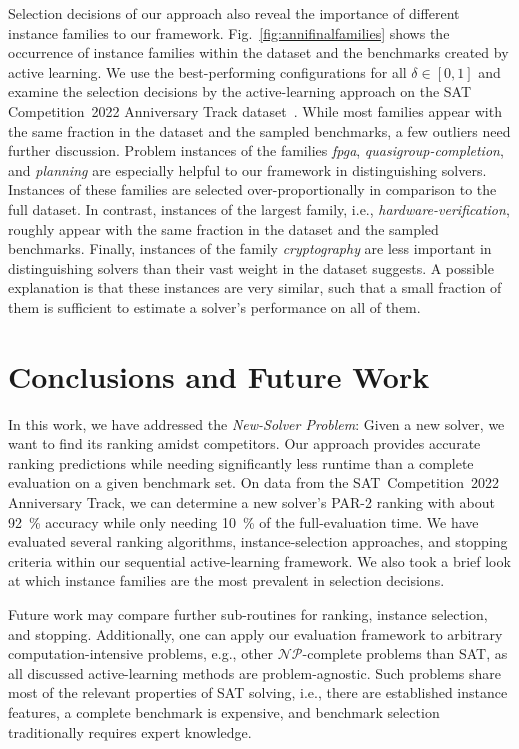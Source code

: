\documentclass[runningheads]{llncs}
\begin{document}
Selection decisions of our approach also reveal the importance of different instance families to our framework.
Fig.~\ref{fig:annifinalfamilies} shows the occurrence of instance families within the dataset and the benchmarks created by active learning.
We use the best-performing configurations for all $\delta \in \left[0, 1\right]$ and examine the selection decisions by the active-learning approach on the SAT Competition~2022 Anniversary Track dataset~\cite{sat2022}.
While most families appear with the same fraction in the dataset and the sampled benchmarks, a few outliers need further discussion.
Problem instances of the families \emph{fpga}, \emph{quasigroup-completion}, and \emph{planning} are especially helpful to our framework in distinguishing solvers.
Instances of these families are selected over-proportionally in comparison to the full dataset.
In contrast, instances of the largest family, i.e., \emph{hardware-verification}, roughly appear with the same fraction in the dataset and the sampled benchmarks.
Finally, instances of the family \emph{cryptography} are less important in distinguishing solvers than their vast weight in the dataset suggests.
A possible explanation is that these instances are very similar, such that a small fraction of them is sufficient to estimate a solver's performance on all of them.

\section{Conclusions and Future Work}

In this work, we have addressed the \emph{New-Solver Problem}:
Given a new solver, we want to find its ranking amidst competitors.
Our approach provides accurate ranking predictions while needing significantly less runtime than a complete evaluation on a given benchmark set.
On data from the SAT~Competition~2022 Anniversary Track, we can determine a new solver's PAR-2 ranking with about \SI{92}{\%} accuracy while only needing \SI{10}{\%} of the full-evaluation time.
We have evaluated several ranking algorithms, instance-selection approaches, and stopping criteria within our sequential active-learning framework.
We also took a brief look at which instance families are the most prevalent in selection decisions.

Future work may compare further sub-routines for ranking, instance selection, and stopping.
Additionally, one can apply our evaluation framework to arbitrary computation-intensive problems, e.g., other $\mathcal{NP}$-complete problems than SAT, as all discussed active-learning methods are problem-agnostic.
Such problems share most of the relevant properties of SAT solving, i.e., there are established instance features, a complete benchmark is expensive, and benchmark selection traditionally requires expert knowledge.
\end{document}
